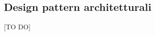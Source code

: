 %
%


\subsection{Design pattern architetturali} %
\label{sub:design_pattern_architetturali}
[TO DO]
